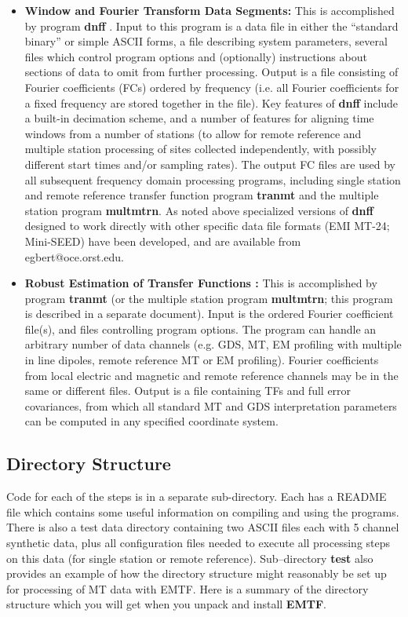 \begin{itemize}
\item {\bf Window and Fourier Transform Data Segments: }
This is accomplished by program {\bf dnff} .
Input to this program is a data file in either the ``standard binary''
or simple ASCII forms, a file describing system parameters,
several files which control program options
and (optionally) instructions about sections of data to omit
from further processing.
Output is a file consisting of Fourier coefficients (FCs) ordered by frequency
(i.e. all Fourier coefficients for a fixed frequency are stored together
in the file).
Key features of {\bf dnff} include a built-in decimation
scheme, and a number of features for aligning time windows from
a number of stations (to allow for remote reference and multiple
station processing of sites collected independently,
with possibly different start times and/or sampling rates).
The output FC files are used by all subsequent frequency domain
processing programs, including single station and remote reference
transfer function program {\bf tranmt} and
the multiple station program {\bf multmtrn}.
As noted above specialized versions of {\bf dnff}
designed to work directly with other specific data file formats (EMI MT-24;
Mini-SEED) have been developed, and are available from egbert@oce.orst.edu.

\item {\bf Robust Estimation of Transfer Functions :}
This is accomplished by program {\bf tranmt}
(or the multiple station program {\bf multmtrn};
this program is described in a separate document).
Input is the ordered Fourier coefficient file(s),
and files controlling program options.
The program can handle an arbitrary number of data channels
(e.g. GDS, MT, EM profiling with multiple in
line dipoles, remote reference MT or EM profiling).
Fourier coefficients from local electric and magnetic and remote
reference channels may be in the same or different files.
Output is a file containing TFs and full error covariances,
from which all standard MT and GDS interpretation parameters can
be computed in any specified coordinate system.
\end{itemize}

\subsection{Directory Structure}

Code for each of the steps is in a separate sub-directory.
Each has a README file which contains some useful information
on compiling and using the programs.
There is also a test data directory containing two ASCII files
each with 5 channel synthetic data, plus all configuration files
needed to execute all processing steps on this data (for single
station or remote reference).  Sub--directory {\bf test} also provides
an example of how the directory structure might reasonably be
set up for processing of MT data with EMTF.  
Here is a summary of the directory structure which you will get
when you unpack and install {\bf EMTF}.

